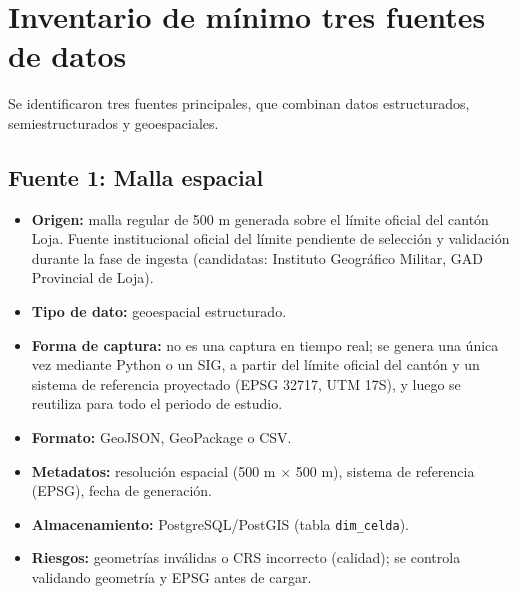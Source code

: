 \documentclass[11pt,a4paper]{article}
\begin{document}
\section{Inventario de m\'inimo tres fuentes de datos}

Se identificaron tres fuentes principales, que combinan datos estructurados, semiestructurados y geoespaciales.

\subsection{Fuente 1: Malla espacial}
\begin{itemize}
    \item \textbf{Origen:} malla regular de 500 m generada sobre el l\'imite oficial del cant\'on Loja. Fuente institucional oficial del l\'imite pendiente de selecci\'on y validaci\'on durante la fase de ingesta (candidatas: Instituto Geogr\'afico Militar, GAD Provincial de Loja).
    \item \textbf{Tipo de dato:} geoespacial estructurado.
    \item \textbf{Forma de captura:} no es una captura en tiempo real; se genera una \'unica vez mediante Python o un SIG, a partir del l\'imite oficial del cant\'on y un sistema de referencia proyectado (EPSG 32717, UTM 17S), y luego se reutiliza para todo el periodo de estudio.
    \item \textbf{Formato:} GeoJSON, GeoPackage o CSV.
    \item \textbf{Metadatos:} resoluci\'on espacial (500 m $\times$ 500 m), sistema de referencia (EPSG), fecha de generaci\'on.
    \item \textbf{Almacenamiento:} PostgreSQL/PostGIS (tabla \texttt{dim\_celda}).
    \item \textbf{Riesgos:} geometr\'ias inv\'alidas o CRS incorrecto (calidad); se controla validando geometr\'ia y EPSG antes de cargar.
\end{itemize}
\end{document}
